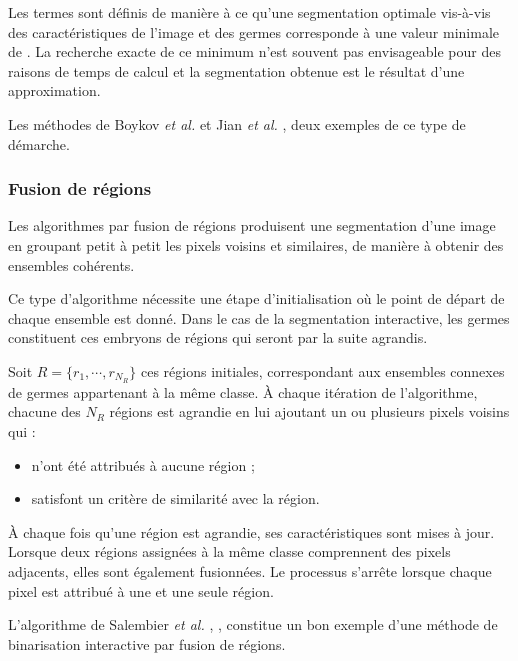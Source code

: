 Les termes  sont définis de manière à ce qu'une segmentation optimale vis-à-vis des caractéristiques de l'image et des germes corresponde à une valeur minimale de . La recherche exacte de ce minimum n'est souvent pas envisageable pour des raisons de temps de calcul et la segmentation obtenue est le résultat d'une approximation.

Les méthodes de Boykov \textit{et al.} \cite{boykov2001interactive}  et  Jian \textit{et al.} \cite{jian2016interactive},  deux exemples de ce type de démarche.
 
\subsubsection{Fusion de régions}

Les algorithmes par fusion de régions produisent une segmentation d'une image en groupant petit à petit les pixels voisins et similaires, de manière à obtenir des ensembles cohérents.

Ce type d'algorithme nécessite une étape d'initialisation où le point de départ de chaque ensemble est donné. Dans le cas de la segmentation interactive, les germes constituent ces embryons de régions qui seront par la suite agrandis. 

Soit $R= \lbrace r_{1}, \cdots, r_{N_{R}} \rbrace $ ces régions initiales, correspondant aux ensembles connexes de germes appartenant à la même classe. À chaque itération de l'algorithme, chacune des $N_{R}$ régions est agrandie en lui ajoutant un ou plusieurs pixels voisins qui :
\begin{itemize}
\item n'ont été attribués à aucune région ;
\item satisfont un critère de similarité avec la région.
\end{itemize}
À chaque fois qu'une région est agrandie, ses caractéristiques sont mises à jour. Lorsque deux régions assignées à la même classe comprennent des pixels adjacents, elles sont également fusionnées. Le processus s'arrête lorsque chaque pixel est attribué à une et une seule région. 

L'algorithme de Salembier \textit{et al.} \cite{salembier2000binary}, , constitue un bon exemple d'une méthode de binarisation interactive par fusion de régions. 

